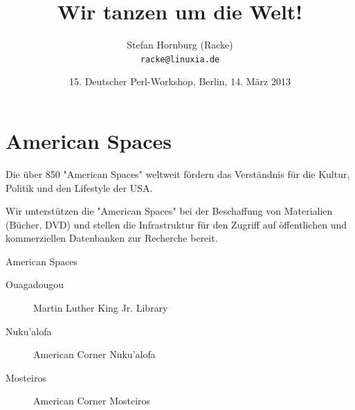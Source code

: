 \usepackage[utf8]{inputenc}
\usepackage[T1]{fontenc}
\usepackage{mathptmx}
\usepackage[scaled=.90]{helvet}
\usepackage{courier}
\usepackage{caption}
\captionsetup{labelformat=empty,labelsep=none}
\usepackage{beamerthemesplit}
\usepackage{verbatim}
\usepackage{hyperref}
\usepackage{listings}
\lstset{language=Perl,basicstyle=\footnotesize,tabsize=3,showstringspaces=false}

\title{Wir tanzen um die Welt!}
\author[racke]{Stefan Hornburg (Racke)\\ \texttt{racke@linuxia.de}}
\date{15. Deutscher Perl-Workshop, Berlin, 14. März 2013}


\maketitle{}

\begin{frame}
  \titlepage
\end{frame}

\tableofcontents

\section{American Spaces}

Die über 850 "American Spaces" weltweit fördern das Verständnis für die Kultur, Politik und den Lifestyle der USA. 

Wir unterstützen die "American Spaces" bei der Beschaffung von Materialien
(Bücher, DVD) und stellen die Infrastruktur für den Zugriff auf öffentlichen
und kommerziellen Datenbanken zur Recherche bereit.

\begin{frame}{American Spaces}
\begin{description}
\item[Ouagadougou] Martin Luther King Jr. Library
\item[Nuku'alofa] American Corner Nuku'alofa

\item[Mosteiros] American Corner Mosteiros

\end{description}
\end{frame}

